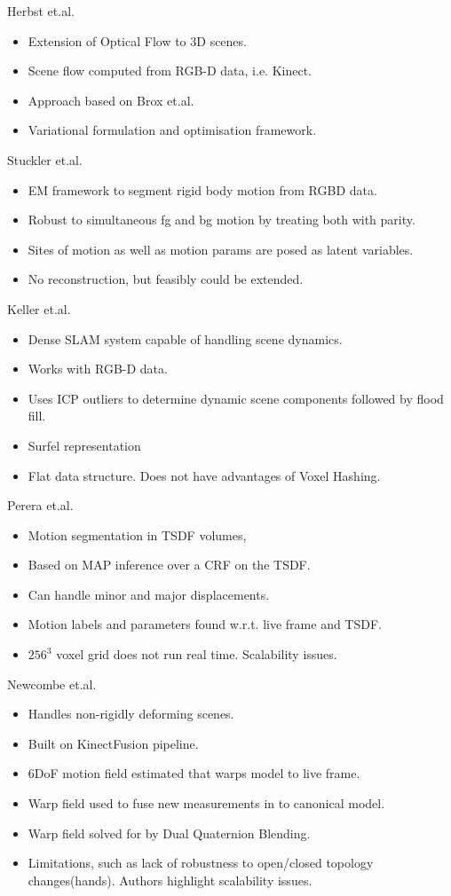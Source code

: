 Herbst et.al. \cite{Herbst2013}
\begin{itemize}
	\item Extension of Optical Flow to 3D scenes.
	\item Scene flow computed from RGB-D data, i.e. Kinect.
	\item Approach based on Brox et.al. \cite{Brox2004}
	\item Variational formulation and optimisation framework.
\end{itemize}

Stuckler et.al. \cite{Stueckler2013}
\begin{itemize}
	\item EM framework to segment rigid body motion from RGBD data.
	\item Robust to simultaneous fg and bg motion by treating both with parity.
	\item Sites of motion as well as motion params are posed as latent variables.
	\item No reconstruction, but feasibly could be extended.
\end{itemize}

Keller et.al. \cite{Keller2013}
\begin{itemize}
	\item Dense SLAM system capable of handling scene dynamics.
	\item Works with RGB-D data.
	\item Uses ICP outliers to determine dynamic scene components followed by flood fill.
	\item Surfel representation \cite{Pfister2000}
	\item Flat data structure. Does not have advantages of Voxel Hashing.
\end{itemize}

Perera et.al. \cite{Perera2015}
\begin{itemize}
	\item Motion segmentation in TSDF volumes,
	\item Based on MAP inference over a CRF on the TSDF.
	\item Can handle minor and major displacements.
	\item Motion labels and parameters found w.r.t. live frame and TSDF.
	\item $256^{3}$ voxel grid does not run real time. Scalability issues.
\end{itemize}

Newcombe et.al. \cite{Newcombe2015}
\begin{itemize}
	\item Handles non-rigidly deforming scenes.
	\item Built on KinectFusion pipeline.
	\item 6DoF motion field estimated that warps model to live frame.
	\item Warp field used to fuse new measurements in to canonical model.
	\item Warp field solved for by Dual Quaternion Blending. \cite{Kavan2006}
	\item Limitations, such as lack of robustness to open/closed topology changes(hands). Authors highlight scalability issues.
\end{itemize}

